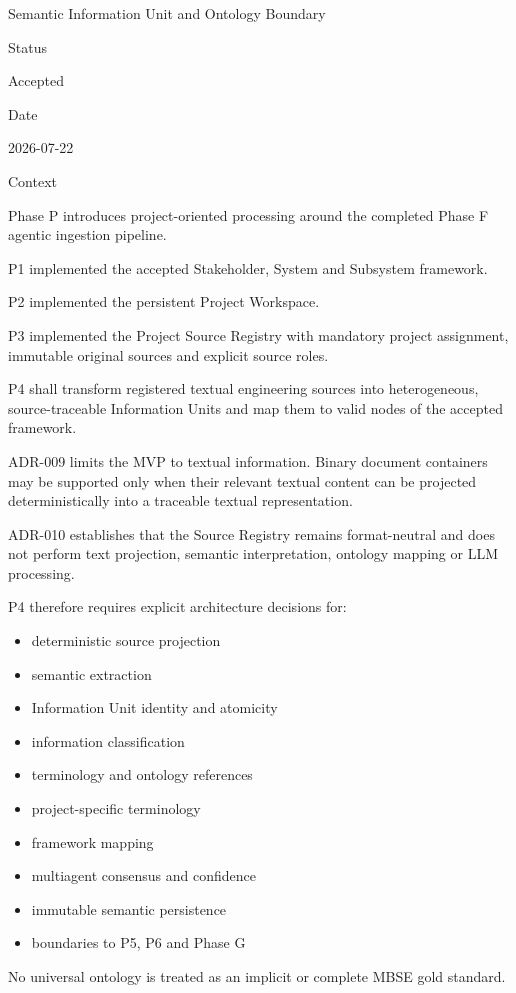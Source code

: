 Semantic Information Unit and Ontology Boundary

Status

Accepted

Date

2026-07-22

Context

Phase P introduces project-oriented processing around the completed Phase F agentic ingestion pipeline.

P1 implemented the accepted Stakeholder, System and Subsystem framework.

P2 implemented the persistent Project Workspace.

P3 implemented the Project Source Registry with mandatory project assignment, immutable original sources and explicit source roles.

P4 shall transform registered textual engineering sources into heterogeneous, source-traceable Information Units and map them to valid nodes of the accepted framework.

ADR-009 limits the MVP to textual information. Binary document containers may be supported only when their relevant textual content can be projected deterministically into a traceable textual representation.

ADR-010 establishes that the Source Registry remains format-neutral and does not perform text projection, semantic interpretation, ontology mapping or LLM processing.

P4 therefore requires explicit architecture decisions for:

\begin{itemize}
\tightlist
\item
  deterministic source projection
\item
  semantic extraction
\item
  Information Unit identity and atomicity
\item
  information classification
\item
  terminology and ontology references
\item
  project-specific terminology
\item
  framework mapping
\item
  multiagent consensus and confidence
\item
  immutable semantic persistence
\item
  boundaries to P5, P6 and Phase G
\end{itemize}

No universal ontology is treated as an implicit or complete MBSE gold standard.


